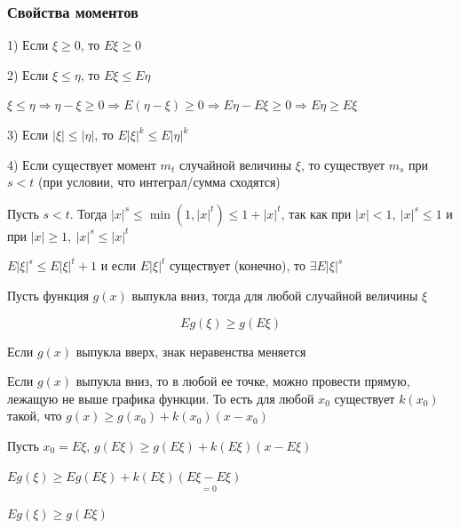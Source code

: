 \documentclass[12pt]{article}
\begin{document}
    \hypertarget{momentsproperties}{}

    \subsubsection{Свойства моментов}

    1) Если $\xi \geq 0$, то $E\xi \geq 0$

    2) Если $\xi \leq \eta$, то $E\xi \leq E\eta$

    \begin{MyProof}
        $\xi \leq \eta \Longrightarrow \eta - \xi \geq 0 \Longrightarrow E(\eta - \xi) \geq 0 \Longrightarrow E\eta - E\xi \geq 0 \Longrightarrow E\eta \geq E\xi$
    \end{MyProof}

    3) Если $|\xi| \leq |\eta|$, то $E|\xi|^k \leq E|\eta|^k$

    4) Если существует момент $m_t$ случайной величины $\xi$, то существует $m_s$ при $s < t$ (при условии, что интеграл/сумма сходятся)

    \begin{MyProof}
        Пусть $s < t$. Тогда $|x|^s \leq \min(1, |x|^t) \leq 1 + |x|^t$, так как при $|x| < 1, \ |x|^s \leq 1$ и при $|x| \geq 1, \ |x|^s \leq |x|^t$
    
        $E|\xi|^s \leq E|\xi|^t + 1$ и если $E|\xi|^t$ существует (конечно), то $\exists E|\xi|^s$
    
    \end{MyProof}

    \hypertarget{jensensinequality}{}

    \begin{MyTheorem}
         Пусть функция $g(x)$ выпукла вниз, тогда для любой случайной величины $\xi$

        \[Eg(\xi) \geq g(E\xi)\]
    \end{MyTheorem}

    \Nota Если $g(x)$ выпукла вверх, знак неравенства меняется
    
    \begin{MyProof}
        Если $g(x)$ выпукла вниз, то в любой ее точке, можно провести прямую, лежащую не выше графика функции. То есть для 
        любой $x_0$ существует $k(x_0)$ такой, что $g(x) \geq g(x_0) + k(x_0) (x - x_0)$

        Пусть $x_0 = E\xi$, $g(E\xi) \geq g(E\xi) + k(E\xi) (x - E\xi)$

        $Eg(\xi) \geq Eg(E\xi) + k(E\xi) \underset{= 0}{(E\xi - E\xi)}$

        $Eg(\xi) \geq g(E\xi)$
    \end{MyProof}
\end{document}
